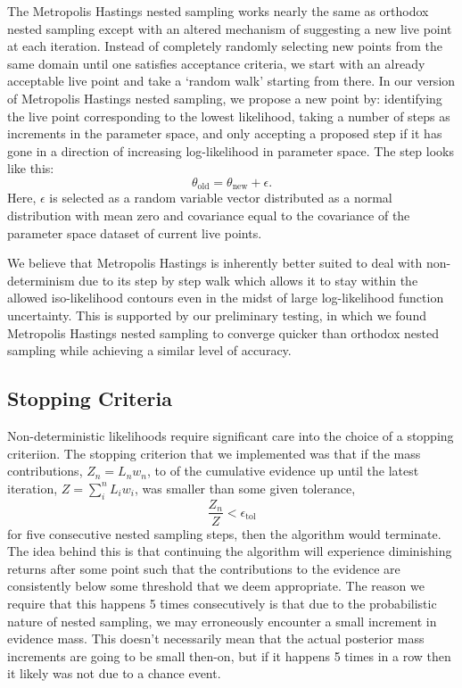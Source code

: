 The Metropolis Hastings nested sampling works nearly the same as orthodox nested sampling except with an altered mechanism of suggesting a new live point at each iteration. Instead of completely randomly selecting new points from the same domain until one satisfies acceptance criteria, we start with an already acceptable live point and take a `random walk' starting from there. In our version of Metropolis Hastings nested sampling, we propose a new point by: identifying the live point corresponding to the lowest likelihood, taking a number of steps as increments in the parameter space, and only accepting a proposed step if it has gone in a direction of increasing log-likelihood in parameter space. The step looks like this:
%
\begin{equation}
\theta_\mathrm{old}=\theta_{\mathrm{new}}+\epsilon.    
\end{equation}
%
Here, $\epsilon$ is selected as a random variable vector distributed as a normal distribution with mean zero and covariance equal to the covariance of the parameter space dataset of current live points.

We believe that Metropolis Hastings is inherently better suited to deal with non-determinism due to its step by step walk which allows it to stay within the allowed iso-likelihood contours even in the midst of large log-likelihood function uncertainty. This is supported by our preliminary testing, in which we found Metropolis Hastings nested sampling to converge quicker than orthodox nested sampling while achieving a similar level of accuracy.



\subsection{Stopping Criteria}
Non-deterministic likelihoods require significant care into the choice of a stopping criteriion. The stopping criterion that we implemented was that if the mass contributions, $ Z_n = L_nw_n$, to of the cumulative evidence up until the latest iteration, $ Z = \sum_i^n L_iw_i$, was smaller than some given tolerance,
\begin{equation}
\frac{ Z_{n}}{ Z}< \epsilon_{\mathrm{tol}}
\end{equation}
 for five consecutive nested sampling steps, then the algorithm would terminate. The idea behind this is that continuing the algorithm will experience diminishing returns after some point such that the contributions to the evidence are consistently below some threshold that we deem appropriate. The reason we require that this happens 5 times consecutively is that due to the probabilistic nature of nested sampling, we may erroneously encounter a small increment in evidence mass. This doesn't necessarily mean that the actual posterior mass increments are going to be small then-on, but if it happens 5 times in a row then it likely was not due to a chance event.

